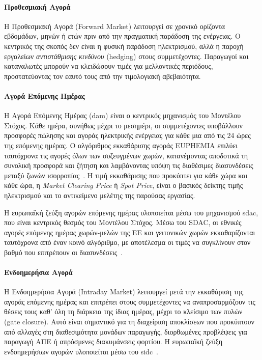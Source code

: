 \paragraph{Προθεσμιακή Αγορά}

Η Προθεσμιακή Αγορά (Forward Market) λειτουργεί σε χρονικό ορίζοντα εβδομάδων, μηνών
ή ετών πριν από την πραγματική παράδοση της ενέργειας. Ο κεντρικός της σκοπός δεν είναι
η φυσική παράδοση ηλεκτρισμού, αλλά η παροχή εργαλείων \textit{αντιστάθμισης κινδύνου}
(hedging) στους συμμετέχοντες. Παραγωγοί και καταναλωτές μπορούν να κλειδώσουν τιμές
για μελλοντικές περιόδους, προστατεύοντας τον εαυτό τους από την τιμολογιακή αβεβαιότητα.

\paragraph{Αγορά Επόμενης Ημέρας}

Η Αγορά Επόμενης Ημέρας (\gls{dam}) είναι ο κεντρικός μηχανισμός του Μοντέλου Στόχος.
Κάθε ημέρα, συνήθως μέχρι το μεσημέρι, οι συμμετέχοντες υποβάλλουν προσφορές πώλησης
και αγοράς ηλεκτρικής ενέργειας για κάθε μια από τις 24 ώρες της επόμενης ημέρας.
Ο αλγόριθμος εκκαθάρισης αγοράς EUPHEMIA επιλύει ταυτόχρονα τις αγορές όλων των
συζευγμένων χωρών, κατανέμοντας αποδοτικά τη συνολική προσφορά και ζήτηση και λαμβάνοντας
υπόψη τις διαθέσιμες διασυνδέσεις μεταξύ ζωνών ισορροπίας~\cite{nemo_sdac}. Η τιμή
εκκαθάρισης που προκύπτει για κάθε χώρα και κάθε ώρα, η \textit{Market Clearing Price}
ή \textit{Spot Price}, είναι ο βασικός δείκτης τιμής ηλεκτρισμού και το αντικείμενο
μελέτης της παρούσας εργασίας.

Η ευρωπαϊκή ζεύξη αγορών επόμενης ημέρας υλοποιείται μέσω του μηχανισμού
\gls{sdac}, που είναι κεντρικός θεσμός του Μοντέλου Στόχος.
Μέσω του SDAC, οι εθνικές αγορές επόμενης ημέρας χωρών-μελών της ΕΕ και γειτονικών χωρών
εκκαθαρίζονται ταυτόχρονα από έναν κοινό αλγόριθμο, με αποτέλεσμα οι τιμές να συγκλίνουν
στον βαθμό που επιτρέπουν οι διασυνδέσεις~\cite{cacm2015}.

\paragraph{Ενδοημερήσια Αγορά}

Η Ενδοημερήσια Αγορά (Intraday Market) λειτουργεί μετά την εκκαθάριση της αγοράς επόμενης ημέρας και επιτρέπει στους συμμετέχοντες να αναπροσαρμόζουν τις θέσεις τους καθ' όλη
τη διάρκεια της ίδιας ημέρας, μέχρι το κλείσιμο των πυλών (gate closure). Αυτό είναι
σημαντικό για τη διαχείριση αποκλίσεων που προκύπτουν από αλλαγές στη
διαθεσιμότητα μονάδων παραγωγής, διορθωμένες προβλέψεις για παραγωγή ΑΠΕ ή απρόσμενες
διακυμάνσεις φορτίου. Η ευρωπαϊκή ζεύξη ενδοημερήσιων αγορών υλοποιείται μέσω του
\gls{sidc}~\cite{cacm2015}.

